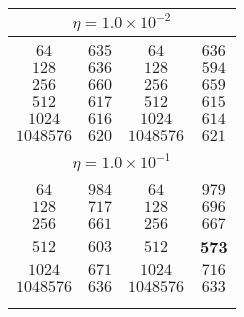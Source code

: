 \begin{center}
\begin{table}[]
\begin{center}
\begin{tabular}{@{}cc|cc@{}}
\multicolumn{4}{c}{$\eta = 1.0\times 10^{-2}$} \\[5pt]
\hline\\[-11pt]
$64$ & $635$  & $64$ & $636$ \\  [1pt]
$128$ & $636$  & $128$ & $594$ \\  [1pt]
$256$ & $660$  & $256$ & $659$ \\  [1pt]
$512$ & $617$  & $512$ & $615$ \\  [1pt]
$1024$ & $616$  & $1024$ & $614$ \\  [1pt]
$1048576$ & $620$   & $1048576$ & $621$ \\  [1pt]
\hline\\[-11pt]

\multicolumn{4}{c}{$\eta = 1.0\times 10^{-1}$} \\[5pt]
\hline\\[-11pt]
$64$ & $984$  & $64$ & $979$ \\  [1pt]
$128$ & $717$  & $128$ & $696$ \\  [1pt]
$256$ & $661$  & $256$ & $667$ \\  [1pt]
$512$ & $603$  & $512$ & \textbf{573} \\  [1pt]
$1024$ & $671$  & $1024$ & $716$ \\  [1pt]
$1048576$ & $636$   & $1048576$ & $633$ \\ [1pt]
\hline\\[-11pt]

\hline\\[-8pt]
\end{tabular}\\[5pt]
\end{center}
\normalsize
\end{table}

\end{center}
\vspace*{\fill}